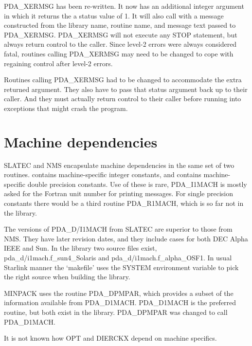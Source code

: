   PDA\_XERMSG has been re-written. It now has an additional integer argument
   in which it returns the a status value of 1. It will
   also call
   with a message constructed from the library name, routine name, and
   message text passed to PDA\_XERMSG. PDA\_XERMSG will not execute any STOP
   statement, but always return control to the caller. Since level-2
   errors were always considered fatal, routines calling PDA\_XERMSG may need
   to be changed to cope with regaining control after level-2 errors.

   Routines calling PDA\_XERMSG had to be changed to accommodate the extra
   returned argument. They also have to pass that status argument back
   up to their caller. And they must actually return control to their
   caller before running into exceptions that might crash the program.


\section{Machine dependencies}

   SLATEC and NMS encapsulate machine dependencies in the same set of
   two routines.
   contains machine-specific integer constants, and
   contains machine-specific double precision constants. Use of these is
   rare, PDA\_I1MACH is mostly asked for the Fortran unit number for printing
   messages. For single precision constants there would be a third
   routine PDA\_R1MACH, which is so far not in the library.

   The versions of PDA\_D/I1MACH from SLATEC are superior to those from NMS.
   They have later revision dates, and they include cases for both DEC
   Alpha IEEE and Sun. In the library two source files exist,
   pda\_d/i1mach.f\_sun4\_Solaris and pda\_d/i1mach.f\_alpha\_OSF1. In
   usual Starlink manner the `makefile' uses the SYSTEM environment
   variable to pick the right source when building the library.

   MINPACK uses the routine PDA\_DPMPAR, which provides a subset of the
   information available from PDA\_D1MACH. PDA\_D1MACH is the preferred
   routine, but both exist in the library. PDA\_DPMPAR was changed to
   call PDA\_D1MACH.

   It is not known how OPT and DIERCKX depend on machine specifics.

